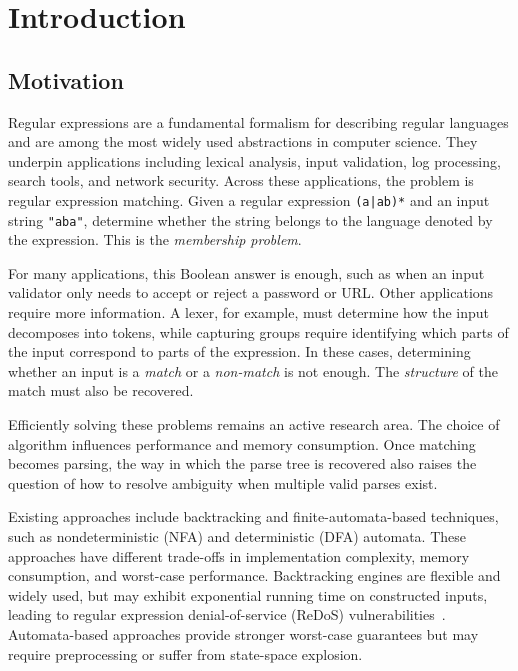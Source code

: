 \chapter{Introduction}

\section{Motivation}
\label{sec:motivation}

Regular expressions are a fundamental formalism for describing regular languages 
and are among the most widely used abstractions in computer science. 
They underpin applications including lexical analysis, 
input validation, log processing, search tools, and network security. 
Across these applications, the problem is regular expression matching. 
Given a regular expression \texttt{(a|ab)*} and an input string \texttt{"aba"}, 
determine whether the string belongs to the language denoted by the expression. 
This is the \emph{membership problem}.

For many applications, this Boolean answer is enough, 
such as when an input validator only needs to accept or reject a password or URL.
Other applications require more information. 
A lexer, for example, must determine how the input decomposes into tokens, 
while capturing groups require identifying 
which parts of the input correspond to parts of the expression. 
In these cases, determining whether an input 
is a \emph{match} or a \emph{non-match} is not enough.
The \emph{structure} of the match must also be recovered.

Efficiently solving these problems remains an active research area.
The choice of algorithm influences performance and memory consumption.
Once matching becomes parsing, 
the way in which the parse tree is recovered also raises the question
of how to resolve ambiguity when multiple valid parses exist.

Existing approaches include backtracking and finite-automata-based techniques, 
such as nondeterministic (NFA) and deterministic (DFA) automata. 
These approaches have different trade-offs in implementation complexity, 
memory consumption, and worst-case performance. 
Backtracking engines are flexible and widely used, 
but may exhibit exponential running time on constructed inputs, 
leading to regular expression denial-of-service (ReDoS) vulnerabilities~\citep{cox2007}.
Automata-based approaches provide stronger worst-case guarantees 
but may require preprocessing or suffer from state-space explosion.

